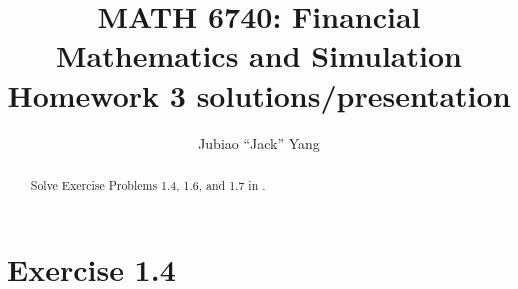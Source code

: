 \documentclass[final,3p,authoryear]{elsarticle}
\begin{document}
\begin{frontmatter}

\title{MATH 6740: Financial Mathematics and Simulation\\
	Homework 3 solutions/presentation}

\author[rvt]{Jubiao ``Jack'' Yang}

\address[rvt]{Rensselaer Polytechnic Institute, Troy, NY 12180}

\begin{abstract}
	Solve Exercise Problems 1.4, 1.6, and 1.7 in \cite[Chapter 1, p.~42-43]{shreve2004stochastic}.
\end{abstract}


\end{frontmatter}

\section{Exercise 1.4}
\end{document}
